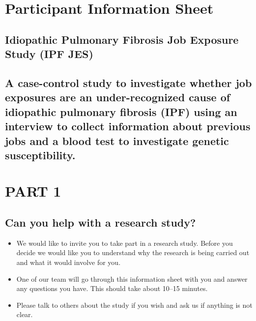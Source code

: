 \documentclass[a4paper,10pt]{article}
\date{}
\begin{document}
\pagestyle{fancy} 



\section*{Participant Information Sheet}

\subsection*{Idiopathic Pulmonary Fibrosis Job Exposure Study (IPF JES)}
\subsection*{A case-control study to investigate whether job exposures are an under-recognized cause of idiopathic pulmonary fibrosis (IPF) using an interview to collect information about previous
jobs and a blood test to investigate genetic susceptibility.}


\section*{PART 1}
\subsection*{Can you help with a research study?}

\begin{itemize}
 \item We would like to invite you to take part in a research study. Before you decide we would like you to understand why the research is being carried out and what it would involve for you.  
 \item One of our team will go through this information sheet with you and answer any questions you have. This should take about 10--15 minutes.
 \item Please talk to others about the study if you wish and ask us if anything is not clear.
\end{itemize}
\end{document}
